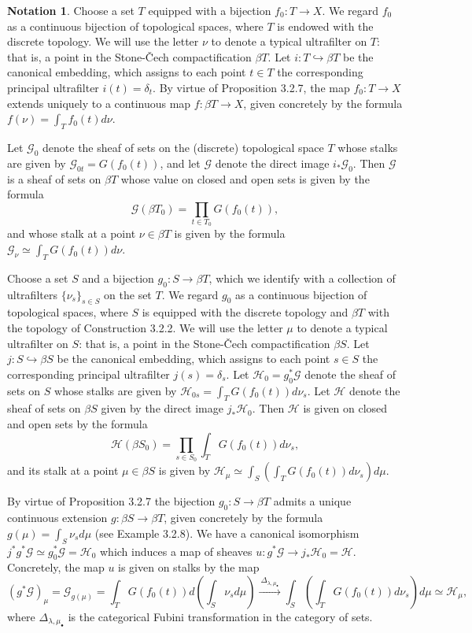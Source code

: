 \documentclass[11pt]{article}
\theoremstyle{plain}
\theoremstyle{definition}
\newtheorem{notation}{Notation}
\begin{document}
\renewcommand{\thenotation}{3.5.2}
\begin{notation}
Choose a set $T$ equipped with a bijection $f_0 : T \to X$. We regard $f_0$ as a continuous bijection of topological spaces, where $T$ is endowed with the discrete topology. We will use the letter $\nu$ to denote a typical ultrafilter on $T$: that is, a point in the Stone-Čech compactification $\beta T$. Let $i : T \hookrightarrow \beta T$ be the canonical embedding, which assigns to each point $t \in T$ the corresponding principal ultrafilter $i(t) = \delta_t$. By virtue of Proposition 3.2.7, the map $f_0 : T \to X$ extends uniquely to a continuous map $f : \beta T \to X$, given concretely by the formula $f(\nu) = \int_T f_0(t)d\nu$.

Let $\mathscr{G}_0$ denote the sheaf of sets on the (discrete) topological space $T$ whose stalks are given by $\mathscr{G}_{0t} = G(f_0(t))$, and let $\mathscr{G}$ denote the direct image $i_*\mathscr{G}_0$. Then $\mathscr{G}$ is a sheaf of sets on $\beta T$ whose value on closed and open sets is given by the formula
\[
\mathscr{G}(\beta T_0) = \prod_{t \in T_0} G(f_0(t)),
\]
and whose stalk at a point $\nu \in \beta T$ is given by the formula $\mathscr{G}_\nu \simeq \int_T G(f_0(t))d\nu$.

Choose a set $S$ and a bijection $g_0 : S \to \beta T$, which we identify with a collection of ultrafilters $\{\nu_s\}_{s \in S}$ on the set $T$. We regard $g_0$ as a continuous bijection of topological spaces, where $S$ is equipped with the discrete topology and $\beta T$ with the topology of Construction 3.2.2. We will use the letter $\mu$ to denote a typical ultrafilter on $S$: that is, a point in the Stone-Čech compactification $\beta S$. Let $j : S \hookrightarrow \beta S$ be the canonical embedding, which assigns to each point $s \in S$ the corresponding principal ultrafilter $j(s) = \delta_s$. Let $\mathscr{H}_0 = g_0^*\mathscr{G}$ denote the sheaf of sets on $S$ whose stalks are given by $\mathscr{H}_{0s} = \int_T G(f_0(t))d\nu_s$. Let $\mathscr{H}$ denote the sheaf of sets on $\beta S$ given by the direct image $j_*\mathscr{H}_0$. Then $\mathscr{H}$ is given on closed and open sets by the formula
\[
\mathscr{H}(\beta S_0) = \prod_{s \in S_0} \int_T G(f_0(t))d\nu_s,
\]
and its stalk at a point $\mu \in \beta S$ is given by $\mathscr{H}_\mu \simeq \int_S (\int_T G(f_0(t))d\nu_s)d\mu$.

By virtue of Proposition 3.2.7 the bijection $g_0 : S \to \beta T$ admits a unique continuous extension $g : \beta S \to \beta T$, given concretely by the formula $g(\mu) = \int_S \nu_s d\mu$ (see Example 3.2.8). We have a canonical isomorphism $j^*g^*\mathscr{G} \simeq g_0^*\mathscr{G} = \mathscr{H}_0$ which induces a map of sheaves $u : g^*\mathscr{G} \to j_*\mathscr{H}_0 = \mathscr{H}$. Concretely, the map $u$ is given on stalks by the map
\[
(g^*\mathscr{G})_\mu = \mathscr{G}_{g(\mu)} = \int_T G(f_0(t))d(\int_S \nu_s d\mu) \xrightarrow{\ \Delta_{\lambda,\mu_\bullet}\ } \int_S (\int_T G(f_0(t))d\nu_s)d\mu \simeq \mathscr{H}_\mu,
\]
where $\Delta_{\lambda,\mu_\bullet}$ is the categorical Fubini transformation in the category of sets.


\end{notation}
\end{document}
